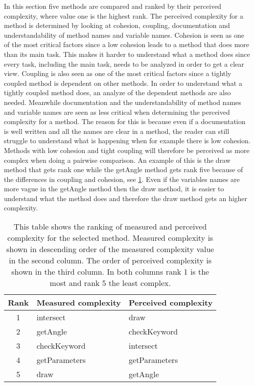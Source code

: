 \documentclass[conference]{IEEEtran}
\begin{document}
In this section five methods are compared and ranked by their perceived complexity, where value one is the highest rank. The perceived complexity for a method is determined by looking at cohesion, coupling, documentation and understandability of method names and variable names. Cohesion is seen as one of the most critical factors since a low cohesion leads to a method that does more than its main task. This makes it harder to understand what a method does since every task, including the main task, needs to be analyzed in order to get a clear view. Coupling is also seen as one of the most critical factors since a tightly coupled method is dependent on other methods. In order to understand what a tightly coupled method does, an analyze of the dependent methods are also needed. Meanwhile documentation and the understandability of method names and variable names are seen as less critical when determining the perceived complexity for a method. The reason for this is because even if a documentation is well written and all the names are clear in a method, the reader can still struggle to understand what is happening when for example there is low cohesion. Methods with low cohesion and tight coupling will therefore be perceived as more complex when doing a pairwise comparison. An example of this is the draw method that gets rank one while the getAngle method gets rank five because of the differences in coupling and cohesion, see \cref{tbl:ranking}. Even if the variables names are more vague in the getAngle method then the draw method, it is easier to understand what the method does and therefore the draw method gets an higher complexity. 


\begin{table}
\centering
	\begin{tabular}{c | l l}
		Rank 	& Measured complexity   & Perceived complexity      \\ \hline 
		1 		& intersect	            & draw                      \\ 
		2 		& getAngle       	    & checkKeyword              \\ 
		3 		& checkKeyword  	    & intersect                 \\ 
		4 		& getParameters         & getParameters             \\ 
		5 		& draw 		            & getAngle                  \\ 
	\end{tabular} 
\caption{This table shows the ranking of measured and perceived complexity for the selected method. Measured complexity is shown in descending order of the measured complexity value in the second column. The order of perceived complexity is shown in the third column. In both columns rank 1 is the most and rank 5 the least complex.}
\label{tbl:ranking}
\end{table}
\end{document}
